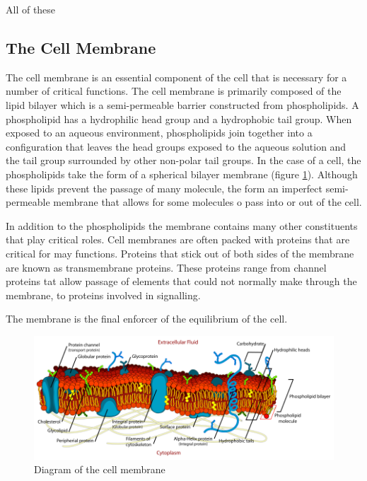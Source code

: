  \par All of these 
 
 \subsection{The Cell Membrane}
 \par The cell membrane is an essential component of the cell that is necessary for a number of critical functions. The cell membrane is primarily composed of the lipid bilayer which is a semi-permeable barrier constructed from phospholipids. A phospholipid has a hydrophilic head group and a hydrophobic tail group. When exposed to an aqueous environment, phospholipids join together into a configuration that leaves the head groups exposed to the aqueous solution and the tail group surrounded by other non-polar tail groups. In the case of a cell, the phospholipids take the form of a spherical bilayer membrane (figure \ref{fig:cell_membrane}). Although these lipids prevent the passage of many molecule, the form an imperfect semi-permeable membrane that allows for some molecules o pass into or out of the cell. 
 
 \par In addition to the phospholipids the membrane contains many other constituents that play critical roles. Cell membranes are often packed with proteins that are critical for may functions. Proteins that stick out of both sides of the membrane are known as transmembrane proteins. These proteins range from channel proteins tat allow passage of elements that could not normally make through the membrane, to proteins involved in signalling. 
 
 \par The membrane is the final enforcer of the equilibrium of the cell. 
 \begin{figure}[h]
    \centering
    \includegraphics[width=\textwidth]{images/Cell_membrane_detailed_diagram.png}
    \caption[Diagram of the cell membrane]{Diagram of the cell membrane \cite{mariana_ruiz_cell_????}}
    \label{fig:cell_membrane}
 \end{figure}
 
